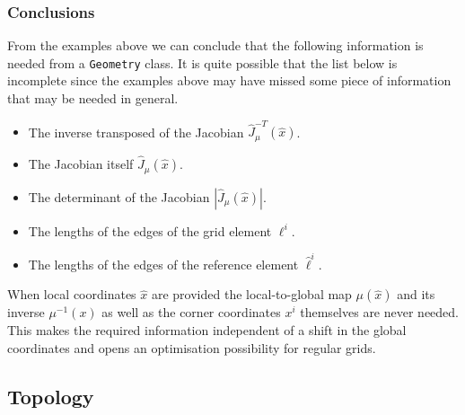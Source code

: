 \documentclass[a4paper,11pt]{article}
\begin{document}
\subsubsection{Conclusions}

From the examples above we can conclude that the following information is
needed from a {\tt Geometry} class.  It is quite possible that the list below
is incomplete since the examples above may have missed some piece of
information that may be needed in general.
\begin{itemize}
\item The inverse transposed of the Jacobian $\hat J_\mu^{-T}(\hat x)$.
\item The Jacobian itself $\hat J_\mu(\hat x)$.
\item The determinant of the Jacobian $|\hat J_\mu(\hat x)|$.
\item The lengths of the edges of the grid element $\ell^i$.
\item The lengths of the edges of the reference element $\hat\ell^i$.
\end{itemize}
When local coordinates $\hat x$ are provided the local-to-global map $\mu(\hat
x)$ and its inverse $\mu^{-1}(x)$ as well as the corner coordinates $x^i$
themselves are never needed.  This makes the required information independent
of a shift in the global coordinates and opens an optimisation possibility for
regular grids.

\subsection{Topology}
\end{document}
